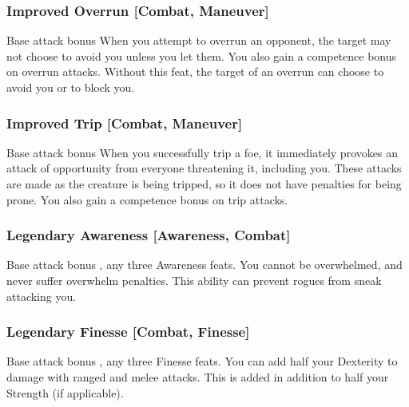 \subsubsection{Improved Overrun [Combat, Maneuver]}
 Base attack bonus 
 When you attempt to overrun an opponent, the target may not choose to avoid you unless you let them. You also gain a  competence bonus on overrun attacks.
 Without this feat, the target of an overrun can choose to avoid you or to block you.

\begin{comment}
\subsubsection{Improved Sunder [Combat, Maneuver]}
\parhead{Prerequisites} Base attack bonus \plus4
\parhead{Benefit} When you strike at an object held or carried by an opponent (such as a weapon or shield), you ignore half the hardness of the sundered item. You also gain a \plus2 competence bonus on sunder attacks.
\end{comment}

\subsubsection{Improved Trip [Combat, Maneuver]}
 Base attack bonus 
 When you successfully trip a foe, it immediately provokes an attack of opportunity from everyone threatening it, including you. These attacks are made as the creature is being tripped, so it does not have penalties for being prone. You also gain a  competence bonus on trip attacks.

\subsubsection{Legendary Awareness [Awareness, Combat]}
\featpre Base attack bonus , any three Awareness feats.
\featben You cannot be overwhelmed, and never suffer overwhelm penalties. This ability can prevent rogues from sneak attacking you.

\subsubsection{Legendary Finesse [Combat, Finesse]}
\featpre Base attack bonus , any three Finesse feats.
\featben You can add half your Dexterity to damage with ranged and melee attacks. This is added in addition to half your Strength (if applicable).

